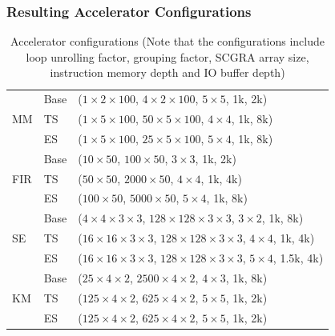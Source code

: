 \documentclass[accentcolor=tud1a,colorbacktitle,inverttitle,landscape,german,presentation,t]{tudbeamer}
\begin{document}
  \begin{frame}
  \frametitle{Resulting Accelerator Configurations}
  \vspace{-1em}
  \begin{table}[htb]
    \footnotesize
    \centering
    \caption{Accelerator configurations (Note that the configurations include loop unrolling factor, grouping factor, SCGRA array size, instruction memory depth and IO buffer depth) \label{tab:acc-config}}{
        \begin{tabular}{l|l|l}
            \hline
            \multirow{3}{*}{MM}  & Base & ($1 \times 2 \times 100$, $4 \times 2 \times 100$, $5
        \times 5$, 1k, 2k)\\ \cline{2-3}
                                 & TS & ($1 \times 5 \times 100$, $50 \times 5 \times 100$, $4
        \times 4$, 1k, 8k)\\ \cline{2-3}
                                 & ES & ($1 \times 5 \times 100$, $25 \times 5 \times 100$, $5
        \times 4$, 1k, 8k)\\ \hline
            \multirow{3}{*}{FIR}  & Base & ($ 10 \times 50$, $100 \times 50$, $3
        \times 3$, 1k, 2k)\\ \cline{2-3}
                                 & TS & ($50 \times 50$, $2000 \times 50 $, $4
        \times 4$, 1k, 4k)\\ \cline{2-3}
                                 & ES & ($100 \times 50$, $5000 \times 50$, $5
        \times 4$, 1k, 8k)\\ \hline
            \multirow{3}{*}{SE}  & Base & ($4 \times 4 \times 3 \times 3$, $128 \times 128 \times 3
        \times 3$, $3 \times 2$, 1k, 8k)\\ \cline{2-3}
                                 & TS & ($16 \times 16 \times 3 \times 3$, $128 \times 128 \times 3
        \times 3$, $4 \times 4$, 1k, 4k)\\ \cline{2-3}
                                 & ES & ($16 \times 16 \times 3 \times 3$, $128 \times 128 \times 3
        \times 3$, $5 \times 4$, 1.5k, 4k)\\ \hline
            \multirow{3}{*}{KM}  & Base & ($25 \times 4 \times 2$, $2500 \times 4 \times 2$, $4
        \times 3$, 1k, 8k)\\ \cline{2-3}
                                 & TS & ($125 \times 4 \times 2$, $625 \times 4 \times 2$, $5
        \times 5$, 1k, 2k)\\ \cline{2-3}
                                 & ES & ($125 \times 4 \times 2$, $625 \times 4 \times 2$, $5
        \times 5$, 1k, 2k)\\ \hline

        \end{tabular}
    }
  \end{table}
  \end{frame}
\end{document}
